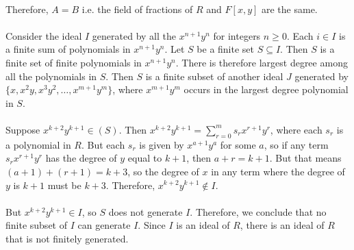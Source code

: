\documentclass[]{article}
\begin{document}
	\paragraph{}
	Therefore, $A = B$ i.e. the field of fractions of $R$ and $F[x,y]$ are the same.
	
	\paragraph{}
	Consider the ideal $I$ generated by all the $x^{n+1}y^n$ for integers $n \ge 0$.\newline
	Each $i \in I$ is a finite sum of polynomials in $x^{n+1}y^n$.\newline
	Let $S$ be a finite set $S \subseteq I$.\newline
	Then $S$ is a finite set of finite polynomials in $x^{n+1}y^n$.\newline
	There is therefore largest degree among all the polynomials in $S$.\newline
	Then $S$ is a finite subset of another ideal $J$ generated by $\{x, x^2y, x^3y^2, \dots, x^{m+1}y^m\}$, where $x^{m+1}y^m$ occurs in the largest degree polynomial in $S$.\newline
	
	\paragraph{}
	Suppose $x^{k+2}y^{k+1} \in (S)$. Then $x^{k+2}y^{k+1} = \sum_{r=0}^{m} s_rx^{r+1}y^r$, where each $s_r$ is a polynomial in $R$.\newline
	But each $s_r$ is given by $x^{a+1}y^a$ for some $a$, so if any term $ s_rx^{r+1}y^r$ has the degree of $y$ equal to $k+1$, then $a + r = k+1$.\newline
	But that means $(a+1) + (r + 1) = k+3$, so the degree of $x$ in any term where the degree of $y$ is $k+1$ must be $k+3$.\newline
	Therefore, $x^{k+2}y^{k+1} \not\in I$.
	
	\paragraph{}
	But $x^{k+2}y^{k+1} \in I$, so $S$ does not generate $I$.\newline
	Therefore, we conclude that no finite subset of $I$ can generate $I$.\newline
	Since $I$ is an ideal of $R$, there is an ideal of $R$ that is not finitely generated.
\end{document}
